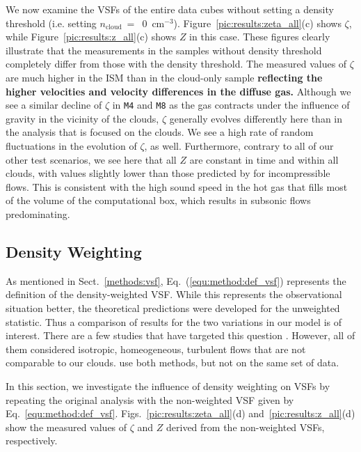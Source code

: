 We now examine the VSFs of the entire data cubes without setting a density threshold (i.e. setting $n_\mathrm{cloud}~=$~0~cm$^{-3}$).  Figure~\ref{pic:results:zeta_all}(c) shows $\zeta$, while Figure~\ref{pic:results:z_all}(c) shows $Z$ in this case.
These figures clearly illustrate that the measurements in the samples without density threshold completely differ from those with the density threshold.
The measured values of $\zeta$ are much higher in the ISM than in the cloud-only sample \textbf{reflecting the higher velocities and velocity differences in the diffuse gas.}
Although we see a similar decline of $\zeta$ in \texttt{M4} and \texttt{M8} as the gas contracts under the influence of gravity in the vicinity of the clouds, $\zeta$ generally evolves differently here than in the analysis that is focused on the clouds.
We see a high rate of random fluctuations in the evolution of $\zeta$, as well.
Furthermore, contrary to all of our other test scenarios, we see here that all $Z$ are constant in time and within all clouds, with values slightly lower than those predicted by \citet{She1994} for incompressible flows.  
This is consistent with the high sound speed in the hot gas that fills most of the volume of the computational box, which results in subsonic flows predominating.


\subsection{Density Weighting}\label{results:densweight}

As mentioned in Sect.~\ref{methods:vsf}, Eq.~(\ref{equ:method:def_vsf}) represents the definition of the density-weighted VSF.
While this represents the observational situation better, the theoretical predictions were developed for the unweighted statistic.  Thus a comparison of results for the two variations in our model is of interest.
There are a few studies that have targeted this question 
\citep[e.g.,][]{Benzi1993,Schmidt2008, Benzi2010,Gotoh2002}.  
However, all of them considered isotropic, homeogeneous, turbulent flows that are not comparable to our clouds.
\citet{Padoan2016a} use both methods, but not on the same set of data. 

In this section, we investigate the influence of density weighting on VSFs by repeating the original analysis with the non-weighted VSF given by Eq.~\ref{equ:method:def_vsf}.
Figs.~\ref{pic:results:zeta_all}(d) and~\ref{pic:results:z_all}(d) show the measured values of $\zeta$ and $Z$ derived from the non-weighted VSFs, respectively.

